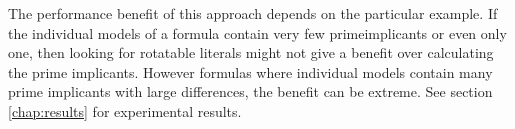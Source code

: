 The performance benefit of this approach depends on the particular example. If the individual models of a formula contain very few primeimplicants or even only one, then looking for rotatable literals might not give a benefit over calculating the prime implicants. However formulas where individual models contain many prime implicants with large differences, the benefit can be extreme. See section \ref{chap:results} for experimental results.



